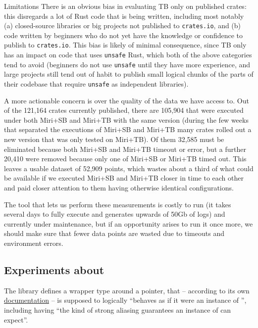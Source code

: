 \documentclass[a4paper,11pt]{article}
\theoremstyle{plain}
\theoremstyle{definition}
\theoremstyle{remark}
\newcommand{\tcode}[1]{\rstinline{#1}}
\begin{document}
\begin{paragraph}{Limitations}
    There is an obvious bias in evaluating TB only on published crates: this disregards a lot of
    Rust code that is being written, including most notably (a) closed-source libraries or big
    projects not published to \texttt{crates.io}, and (b) code written by beginners who do not
    yet have the knowledge or confidence to publish to \texttt{crates.io}.
    This bias is likely of minimal consequence, since TB only has an impact on code that uses
    \texttt{unsafe} Rust, which both of the above categories tend to avoid (beginners do
    not use \texttt{unsafe} until they have more experience, and large projects still tend out
    of habit to publish small logical chunks of the parts of their codebase that require \texttt{unsafe}
    as independent libraries).

    A more actionable concern is over the quality of the data we have access to.
    Out of the 121,164 crates currently published, there are 105,904 that were executed under both
    Miri+SB and Miri+TB with the same version (during the few weeks that separated the executions
    of Miri+SB and Miri+TB many crates rolled out a new version that was only tested on Miri+TB).
    Of them 32,585 must be eliminated because both Miri+SB and Miri+TB timeout or error,
    but a further 20,410 were removed because only one of Miri+SB or Miri+TB timed out.
    This leaves a usable dataset of 52,909 points, which wastes about a third of what could be
    available if we executed Miri+SB and Miri+TB closer in time to each other and paid closer
    attention to them having otherwise identical configurations.

    The tool that lets us perform these measurements is costly to run (it takes several days to
    fully execute and generates upwards of 50Gb of logs) and currently under maintenance,
    but if an opportunity arises to run it once more, we should make sure that fewer data points
    are wasted due to timeouts and environment errors.
\end{paragraph}

\subsection{Experiments about \tcode{Unique}}

The \tcode{core} library defines a wrapper type around a pointer, \tcode{ptr::Unique<T>} that -- according to
its own \href{https://doc.rust-lang.org/src/core/ptr/unique.rs.html#11}{documentation} --
is supposed to logically ``behaves as if it were an instance of \tcode{T}'',
including having ``the kind of strong aliasing guarantees an instance of \tcode{T} can expect''.
\end{document}
